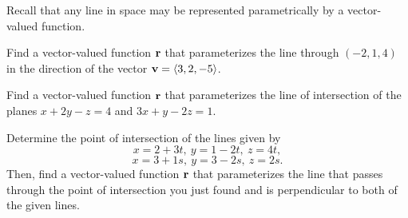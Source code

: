 \begin{exercises}
\item \label{Ez:9.6.4}   Recall that any line in space may be represented parametrically by a vector-valued function.


\ba
	\item Find a vector-valued function $\mathbf{r}$ that parameterizes the line through $(-2,1,4)$ in the direction of the vector $\mathbf{v} = \langle 3, 2, -5 \rangle$.
	\item Find a vector-valued function $\mathbf{r}$ that parameterizes the line of intersection of the planes $x + 2y - z = 4$ and $3x + y - 2z = 1$.
	\item Determine the point of intersection of the lines given by 
	$$x = 2 + 3t, \ y = 1 - 2t, \ z = 4t,$$
	$$x = 3 + 1s, \ y = 3-2s, \ z = 2s.$$
	Then, find a vector-valued function $\mathbf{r}$ that parameterizes the line that passes through the point of intersection you just found and is perpendicular to both of the given lines.
\ea


\end{exercises}
